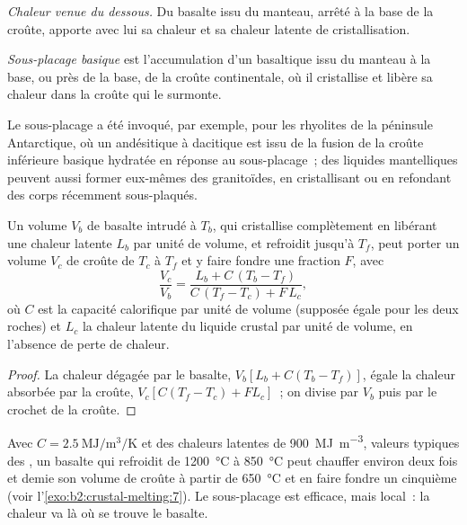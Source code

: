\emph{Chaleur venue du dessous.} Du basalte issu du manteau, arrêté à la base de la croûte, apporte
avec lui sa chaleur et sa chaleur latente de cristallisation.

\begin{definition}\label{def:b2:crustal-melting:underplating}
\emph{Sous-placage basique} est l'accumulation d'un  basaltique issu du manteau
à la base, ou près de la base, de la croûte continentale, où il cristallise et
libère sa chaleur dans la croûte qui le surmonte.
\end{definition}

Le sous-placage a été invoqué, par exemple, pour les rhyolites de la péninsule Antarctique,
où un  andésitique à dacitique est issu de la fusion de la croûte inférieure basique hydratée en réponse au
sous-placage~; des liquides mantelliques peuvent aussi former eux-mêmes des granitoïdes, en cristallisant
ou en refondant des corps récemment sous-plaqués.

\begin{proposition}\label{prop:b2:crustal-melting:heat}
Un volume $V_b$ de basalte intrudé à $T_b$, qui cristallise complètement en libérant une chaleur latente $L_b$
par unité de volume, et refroidit jusqu'à $T_f$, peut porter un volume $V_c$ de croûte de $T_c$ à $T_f$
et y faire fondre une fraction $F$, avec
\[\frac{V_c}{V_b} = \frac{L_b + C\,(T_b - T_f)}{C\,(T_f - T_c) + F\,L_c},\]
où $C$ est la capacité calorifique par unité de volume (supposée égale pour les deux roches) et $L_c$ la
chaleur latente du liquide crustal par unité de volume, en l'absence de perte de chaleur.
\end{proposition}

\begin{proof}
La chaleur dégagée par le basalte, $V_b[L_b + C(T_b - T_f)]$, égale la chaleur absorbée par la
croûte, $V_c[C(T_f - T_c) + F L_c]$~; on divise par $V_b$ puis par le crochet de la croûte.
\end{proof}

Avec $C = \qty{2.5}{\mega\joule\per\cubic\metre\per\kelvin}$ et des chaleurs latentes de
\qty{900}{\mega\joule\per\cubic\metre}, valeurs typiques des , un basalte qui refroidit de
\qty{1200}{\celsius} à \qty{850}{\celsius} peut chauffer environ deux fois et demie son volume de
croûte à partir de \qty{650}{\celsius} et en faire fondre un cinquième (voir l'\cref{exo:b2:crustal-melting:7}).
Le sous-placage est efficace, mais local~: la chaleur va là où se trouve le basalte.

